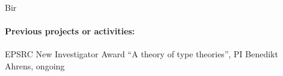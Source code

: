 \begin{sitedescription}{Bir}
\paragraph*{Previous projects or activities:}

\begin{compactitem}
 \item EPSRC New Investigator Award ``A theory of type theories'', PI Benedikt Ahrens, ongoing
\end{compactitem}



% 





\end{sitedescription}
